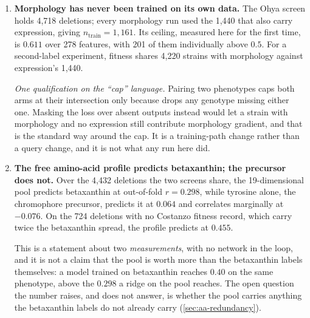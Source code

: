 \begin{enumerate}
  The scGPT-style masked scheme is a different axis and does not repair this. It conditions
  gene $i$'s token on \emph{other genes' measured expression values} in the same strain,
  through features that are gated by a reveal mask. At $k = 0$ no gene is revealed, so those
  input features are zero \emph{as inputs} and the whole conditioning branch contributes
  nothing. The measurements themselves are of course not zero; what is zero is the branch
  that reads them, because nothing has been revealed to it. Scoring happens at $k = 0$.

  Capacity is not the binding constraint either: a rank-32 reconstruction of the target
  matrix reaches $0.727$ against a best model run of $0.238$. A rank-64 pair term already
  reaches $0.2274$ in 2.0 days against the masked objective's $0.2362$ in 3.8.

\item \textbf{Morphology has never been trained on its own data.} The Ohya screen holds
  4,718 deletions; every morphology run used the 1,440 that also carry expression, giving
  $n_{\mathrm{train}} = 1{,}161$. Its ceiling, measured here for the first time, is
  $\mathbf{0.611}$ over 278 features, with 201 of them individually above $0.5$. For a
  second-label experiment, fitness shares 4,220 strains with morphology against
  expression's 1,440.

  \emph{One qualification on the ``cap'' language.} Pairing two phenotypes caps both arms at
  their intersection only because  drops any genotype missing
  either one. Masking the loss over absent outputs instead would let a strain with
  morphology and no expression still contribute morphology gradient, and that is the
  standard way around the cap. It is a training-path change rather than a query change, and
  it is not what any run here did.

\item \textbf{The free amino-acid profile predicts betaxanthin; the precursor does not.}
  Over the 4,432 deletions the two screens share, the 19-dimensional pool predicts
  betaxanthin at out-of-fold $r = \mathbf{0.298}$, while tyrosine alone, the chromophore
  precursor, predicts it at $\mathbf{0.064}$ and correlates marginally at $-0.076$. On the
  724 deletions with no Costanzo fitness record, which carry twice the betaxanthin spread,
  the profile predicts at $0.455$.

  This is a statement about two \emph{measurements}, with no network in the loop, and it is
  not a claim that the pool is worth more than the betaxanthin labels themselves: a model
  trained on betaxanthin reaches $0.40$ on the same phenotype, above the $0.298$ a ridge on
  the pool reaches. The open question the number raises, and does not answer, is whether the
  pool carries anything the betaxanthin labels do not already carry
  (\cref{sec:aa-redundancy}).


\end{enumerate}

